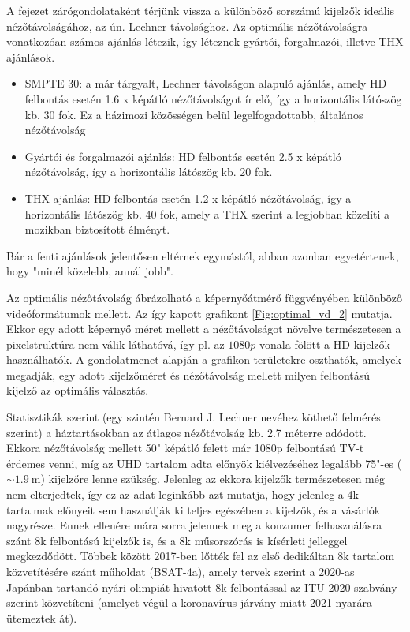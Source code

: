 A fejezet zárógondolataként térjünk vissza a különböző sorszámú kijelzők ideális nézőtávolságához, az ún. Lechner távolsághoz.
Az optimális nézőtávolságra vonatkozóan számos ajánlás létezik, így léteznek gyártói, forgalmazói, illetve THX ajánlások.
\begin{itemize}
\item SMPTE 30: a már tárgyalt, Lechner távolságon alapuló ajánlás, amely HD felbontás esetén 1.6 x képátló nézőtávolságot ír elő, így a horizontális látószög kb. 30 fok.
Ez a házimozi közösségen belül legelfogadottabb, általános nézőtávolság
\item Gyártói és forgalmazói ajánlás: HD felbontás esetén 2.5 x képátló nézőtávolság, így a horizontális látószög kb. 20 fok.
\item THX ajánlás: HD felbontás esetén 1.2 x képátló nézőtávolság, így a horizontális látószög kb. 40 fok, amely a THX szerint a legjobban közelíti a mozikban biztosított élményt.
\end{itemize}
Bár a fenti ajánlások jelentősen eltérnek egymástól, abban azonban egyetértenek, hogy "minél közelebb, annál jobb".

Az optimális nézőtávolság ábrázolható a képernyőátmérő függvényében különböző videóformátumok mellett.
Az így kapott grafikont \ref{Fig:optimal_vd_2} mutatja.
Ekkor egy adott képernyő méret mellett a nézőtávolságot növelve természetesen a pixelstruktúra nem válik láthatóvá, így pl. az $1080p$ vonala fölött a HD kijelzők használhatók.
A gondolatmenet alapján a grafikon területekre oszthatók, amelyek megadják, egy adott kijelzőméret és nézőtávolság mellett milyen felbontású kijelző az optimális választás.

Statisztikák szerint (egy szintén Bernard J. Lechner nevéhez köthető felmérés szerint) a háztartásokban az átlagos nézőtávolság kb. 2.7 méterre adódott.
Ekkora nézőtávolság mellett 50" képátló felett már 1080p felbontású TV-t érdemes venni, míg az UHD tartalom adta előnyök kiélvezéséhez legalább 75"-es ($\sim 1.9~\mathrm{m}$) kijelzőre lenne szükség.
Jelenleg az ekkora kijelzők természetesen még nem elterjedtek, így ez az adat leginkább azt mutatja, hogy jelenleg a 4k tartalmak előnyeit sem használják ki teljes egészében a kijelzők, és a vásárlók nagyrésze.
Ennek ellenére mára sorra jelennek meg a konzumer felhasználásra szánt 8k felbontású kijelzők is, és a 8k műsorszórás is kísérleti jelleggel megkezdődött.
Többek között 2017-ben lőtték fel az első dedikáltan 8k tartalom közvetítésére szánt műholdat (BSAT-4a), amely tervek szerint a 2020-as Japánban tartandó nyári olimpiát hivatott 8k felbontással az ITU-2020 szabvány szerint közvetíteni (amelyet végül a koronavírus járvány miatt 2021 nyarára ütemeztek át).


